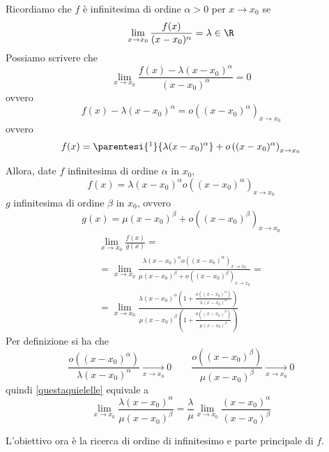 Ricordiamo che $ f $ è infinitesima di ordine $ \alpha>0$ per $ x\to x_0 $ se \[
    \lim_{x\to x_0} \frac{f(x)}{(x-x_0)^{\alpha}} = \lambda \in \R 
\]
Possiamo scrivere che \[
    \lim_{x\to x_0} \frac{f(x)-\lambda (x-x_0)^\alpha}{(x- x_0 )^\alpha} =0
\] ovvero \[
    f(x)-\lambda (x-x_0)^\alpha = o((x- x_0 )^\alpha)_{x\to x_0}
\] ovvero \[
    f(x)= \parentesi{\footnotemark}{\lambda (x-x_0)^{\alpha}} + o \left((x-x_0)^{\alpha}\right)_{x\to x_0}
\]

Allora, date $ f $ infinitesima di ordine $ \alpha $ in $ x_0 $, 
\[
    f(x)= \lambda(x-x_0)^{\alpha} o \left((x-x_0)^{\alpha}\right)_{x\to x_0}
\]
$ g $ infinitesima di ordine $ \beta $ in $ x_0 $, ovvero \[
    g(x)= \mu(x-x_0)^{\beta}+ o\left((x-x_0)^{\beta}\right)_{x\to x_0}
\]
\begin{multline}
    \lim_{x\to x_0} \frac{f(x)}{g(x)} =\\
    = \lim_{x\to x_0} \frac{\lambda(x-x_0)^{\alpha} o \left((x-x_0)^{\alpha}\right)_{x\to x_0}}{\mu(x-x_0)^{\beta}+ o\left((x-x_0)^{\beta}\right)_{x\to x_0}}=\\
    = \lim_{x\to x_0} \frac{\lambda(x-x_0)^{\alpha}\left(1+\frac{o\left((x-x_0)^{\alpha}\right)}{\lambda(x-x_0)^{\alpha}}\right)}{\mu(x-x_0)^{\beta}\left(1+\frac{o\left((x-x_0)^{\beta}\right)}{\mu(x-x_0)^{\beta}}\right)}\label{questaquielelle}
\end{multline}
Per definizione si ha che \[
    \frac{o\left((x-x_0)^{\alpha}\right)}{\lambda(x-x_0)^{\alpha}} \xrightarrow[x\to x_0]{}  0 \qquad \frac{o\left((x-x_0)^{\beta}\right)}{\mu(x-x_0)^{\beta}} \xrightarrow[x\to x_0]{}  0
\] quindi \eqref{questaquielelle} equivale a
\begin{equation}
    \lim_{x\to x_0} \frac{\lambda(x-x_0)^{\alpha}}{\mu(x-x_0)^{\beta}}=\frac{\lambda}{\mu} \lim_{x\to x_0} \frac{(x-x_0)^{\alpha}}{(x-x_0)^{\beta}}
\end{equation}

L'obiettivo ora è la ricerca di ordine di infinitesimo e parte principale di $ f $.


